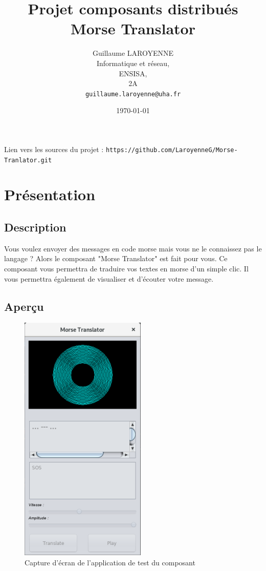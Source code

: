 \documentclass[a4paper,11pt]{article}
\title{\LARGE{Projet composants distribués}\\\bigskip \textbf{Morse Translator}}
\author{Guillaume LAROYENNE\\
   Informatique et réseau,\\
   ENSISA,\\
   2A\\
   \bigskip
   \texttt{guillaume.laroyenne@uha.fr}
   }
\date{\today}
\begin{document}
  \maketitle
  \begin{center}
  \large{Lien vers les sources du projet :} \texttt{https://github.com/LaroyenneG/Morse-Tranlator.git}
  \end{center}
      
  \newpage

	\section{Présentation}
	\subsection{Description}
	Vous voulez envoyer des messages en code morse mais vous ne le connaissez pas le langage ? Alors le composant "Morse Translator" est fait pour vous. Ce composant vous permettra de traduire vos textes en morse d'un simple clic. Il vous permettra également de visualiser et d'écouter votre message.
	
    \subsection{Aperçu}
    \begin{figure}[H]
    	\begin{center}
    		\includegraphics[scale=0.8]{descpicture.png}
    		\caption{Capture d'écran de l'application de test du composant}
    		\label{Capture d'écran de l'application de test du composant}
    	\end{center}
    \end{figure}
    
\end{document}
